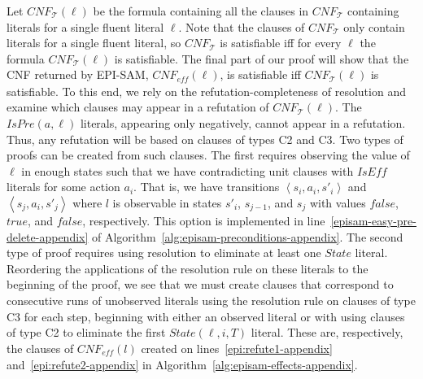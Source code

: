 \documentclass[letterpaper]{article} %
\newcommand{\tuple}[1]{\ensuremath{\left \langle #1 \right \rangle }}
\newcommand{\eff}{\textit{eff}}
\newcommand{\cnf}{\textit{CNF}}
\newcommand{\true}{\textit{true}}
\newcommand{\false}{\textit{false}}
\newcommand{\iseff}{\textit{IsEff}}
\newcommand{\ispre}{\textit{IsPre}}
\newcommand{\state}{\textit{State}}
\begin{document}
Let $\cnf_\mathcal{T}(\ell)$ be the formula containing all the clauses in $\cnf_\mathcal{T}$ containing literals for a single fluent literal $\ell$.
Note that the clauses of $\cnf_\mathcal{T}$ only contain literals for a single fluent literal, so 
$\cnf_\mathcal{T}$ is satisfiable iff for every $\ell$ the formula $\cnf_{\mathcal{T}}(\ell)$ is satisfiable. 
The final part of our proof will show that the CNF returned by EPI-SAM, $\cnf_\eff(\ell)$, is satisfiable iff $\cnf_\mathcal{T}(\ell)$ is satisfiable. 
To this end, we rely on the refutation-completeness of resolution and examine which clauses may appear in a refutation of $\cnf_{\mathcal{T}}(\ell)$. 
The $\ispre(a,\ell)$ literals, appearing only negatively, cannot appear in a refutation. 
Thus, any refutation will be based on clauses of types C2 and C3. 
Two types of proofs can be created from such clauses. 
The first requires observing the value of $\ell$ in enough states such that we have contradicting unit clauses with $\iseff$ literals for some action $a_i$. That is, we have transitions 
$\tuple{s_i,a_i,s'_i}$ and $\tuple{s_j,a_i,s'_j}$
where $l$ is observable in states 
$s'_i$, $s_{j-1}$, and $s_j$ 
with values $\false$, $\true$, and $\false$, respectively.
This option is implemented in line~\ref{episam-easy-pre-delete-appendix} of Algorithm~\ref{alg:episam-preconditions-appendix}. 
The second type of proof requires using resolution to eliminate at least one $\state$ literal. Reordering the applications of the resolution rule on these literals to the beginning of the proof, we see that we must create clauses that correspond to consecutive runs of unobserved literals using the resolution rule on clauses of type C3 for each step, beginning with either an observed literal or with using clauses of type C2 to eliminate the first $\state(\ell, i, T)$ literal. These are, respectively, the clauses of $\cnf_{\eff}(l)$ created on lines~\ref{epi:refute1-appendix} and~\ref{epi:refute2-appendix} in Algorithm~\ref{alg:episam-effects-appendix}.
\end{document}
